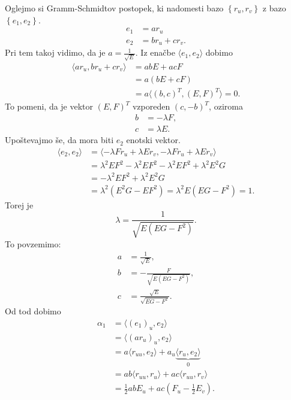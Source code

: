 Oglejmo si Gramm-Schmidtov postopek, ki nadomesti bazo $\left\{ r_u, r_v\right\}$ z bazo $\left\{ e_1, e_2 \right\} $. \begin{align*}
    e_1 &= a r_u   \\
    e_2 &= b r_u + c r_v.
\end{align*}
Pri tem takoj vidimo, da je $a = \frac{1}{\sqrt{E} }$. Iz enačbe $\langle e_1, e_2 \rangle$ dobimo \begin{align*}
    \langle a r_u , b r_u + c r_v \rangle  &= ab E + ac F  \\
     &= a(bE + cF) \\
     &= a \langle (b, c)^{T}, (E, F)^{T} \rangle = 0. 
\end{align*}
To pomeni, da je vektor $(E, F)^{T}$ vzporeden $(c, -b)^{T}$, oziroma \begin{align*}
    b &= -\lambda F, \\
    c &= \lambda E.
\end{align*}
Upoštevajmo še, da mora biti $e_2$ enotski vektor. \begin{align*}
    \langle e_2, e_2 \rangle  &= \langle - \lambda F r_u + \lambda E r_v, -\lambda F r_u + \lambda E r_v \rangle   \\
     &= \lambda^2 E F^2 - \lambda^2 E F^2 - \lambda^2 EF^2 + \lambda^2 E^2 G \\
     &= -\lambda^2 E F^2 + \lambda^2 E^2 G \\
     &= \lambda^2 (E^2 G - EF^2 ) = \lambda^2  E (EG - F^2) = 1.
\end{align*}
Torej je \begin{equation*}
\lambda = \frac{1}{\sqrt{E (EG - F^2)}}.
\end{equation*}  
To povzemimo: \begin{align*}
    a &= \frac{1}{\sqrt{E}}, \\
    b  &= -\frac{F}{\sqrt{E (EG - F^2)}}, \\
    c &= \frac{\sqrt{E}}{\sqrt{EG - F^2}}.
\end{align*}
Od tod dobimo \begin{align*}
    \alpha_1 &= \langle (e_1)_u, e_2 \rangle  \\
     &= \langle (a r_u)_u, e_2 \rangle  \\
     &= a \langle r_{uu}, e_2 \rangle + a_u \underbrace{\langle r_u, e_2 \rangle}_0  \\
    &= ab \langle r_{uu}, r_u \rangle + ac \langle r_{uu}, r_v \rangle \\
    &= \frac{1}{2} ab E_u + ac \left(F_u - \frac{1}{2} E_v \right). 
\end{align*}
